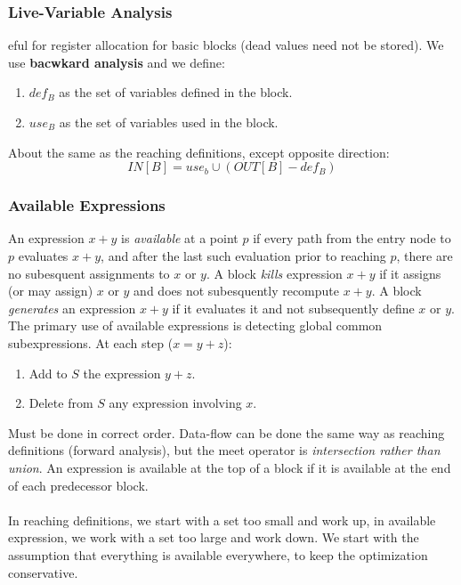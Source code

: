 \documentclass{article}
\begin{document}

\subsubsection{Live-Variable Analysis} %
\label{ssub:Live-Variable Analysis}
eful for register allocation for basic blocks (dead values need not be stored). We use \textbf{bacwkard analysis} and we define:
\begin{enumerate}
	\item $def_B$ as the set of variables defined in the block.
	\item $use_B$ as the set of variables used in the block.
\end{enumerate}
About the same as the reaching definitions, except opposite direction:
\begin{equation}
	IN[B] = use_b \cup (OUT[B] - def_B)
\end{equation}

\subsubsection{Available Expressions} %
\label{ssub:Availabel Expressions}
An expression $x + y$ is \emph{available} at a point $p$ if every path from the entry node to $p$ evaluates $x + y$, and after the last such evaluation prior to reaching $p$, there are no subesquent assignments to $x$ or $y$. A block \emph{kills} expression $x + y$ if it assigns (or may assign) $x$ or $y$ and does not subesquently recompute $x + y$. A block \emph{generates} an expression $x + y$ if it evaluates it and not subsequently define $x$ or $y$. The primary use of available expressions is detecting global common subexpressions. At each step ($x = y + z$):
\begin{enumerate}
	\item Add to $S$ the expression $y + z$.
	\item Delete from $S$ any expression involving $x$.
\end{enumerate}
Must be done in correct order. Data-flow can be done the same way as reaching definitions (forward analysis), but the meet operator is \emph{intersection rather than union}. An expression is available at the top of a block if it is available at the end of each predecessor block.\\
\\
In reaching definitions, we start with a set too small and work up, in available expression, we work with a set too large and work down. We start with the assumption that everything is available everywhere, to keep the optimization conservative.
\end{document}
